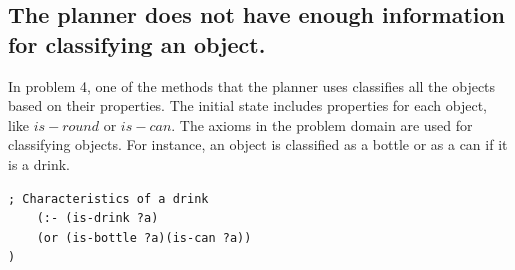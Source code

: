 \documentclass[paper=a4, fontsize=11pt]{scrartcl}
\begin{document}
	\subsection*{The planner does not have enough information for classifying an object.}
	
	In problem 4, one of the methods that the planner uses classifies all the objects based on their properties. The initial state includes properties for each object, like $is-round$ or $is-can$. The axioms in the problem domain are used for classifying objects. For instance, an object is classified as a bottle or as a can if it is a drink. 
	
	\begin{lstlisting}
; Characteristics of a drink
	(:- (is-drink ?a)
	(or (is-bottle ?a)(is-can ?a))
)

	\end{lstlisting}


	

	{}
	
	
	
\end{document}
